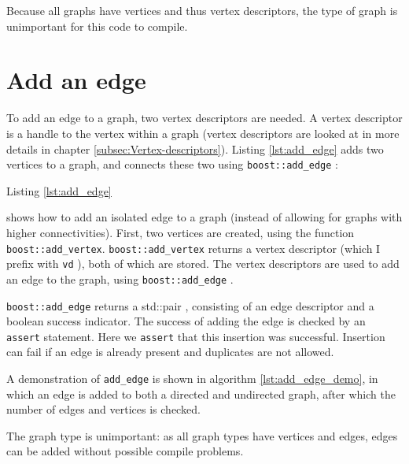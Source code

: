 Because all graphs have vertices and thus vertex descriptors, the type of
graph is unimportant for this code to compile.

\section{Add an edge}
\label{subsec:add_edge}

To add an edge to a graph, two vertex descriptors are needed.
A vertex descriptor 
is a handle to the vertex within a graph (vertex descriptors are looked
 at in more details in chapter 
\ref{subsec:Vertex-descriptors}).
Listing \ref{lst:add_edge}
adds two vertices to a graph, and connects these two using 
\verb;boost::add_edge; : 



Listing \ref{lst:add_edge}

shows how to add an isolated edge to a graph (instead of allowing for graphs
with higher connectivities).
First, two vertices are created, using the function \verb;boost::add_vertex;.
\verb;boost::add_vertex; returns a vertex descriptor 
(which I prefix with \verb;vd; ), 
both of which are stored.
The vertex descriptors are used to add an edge to the graph, 
using 
\verb;boost::add_edge; .

\verb;boost::add_edge; 
returns a std::pair , 
consisting of an edge descriptor and a boolean success indicator.
The success of adding the edge is checked by an \verb;assert; statement.
Here we \verb;assert; 
that this insertion was successful.
Insertion can fail if an edge is already present and duplicates are not
allowed.

A demonstration of \verb;add_edge; is shown in algorithm 
\ref{lst:add_edge_demo}, 
in which an edge is added to both a directed and undirected graph, 
after which the number of edges and vertices is checked.



The graph type is unimportant: as all graph types have vertices and edges,
 edges can be added without possible compile problems.

